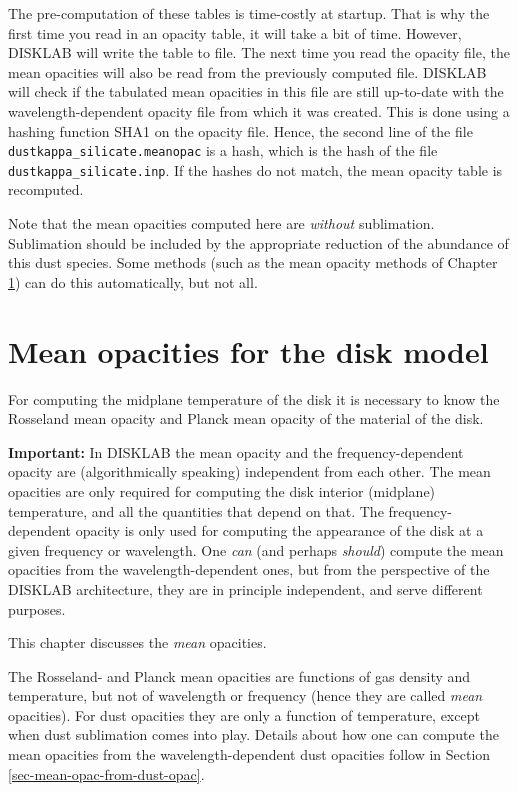 \documentclass{book}
\newcommand{\code}[1]{{\small\tt #1}}
\begin{document}
The pre-computation of these tables is time-costly at startup. That is why the
first time you read in an opacity table, it will take a bit of time.  However,
{\sf DISKLAB} will write the table to file. The next time you read the opacity
file, the mean opacities will also be read from the previously computed
file. {\sf DISKLAB} will check if the tabulated mean opacities in this file are
still up-to-date with the wavelength-dependent opacity file from which it was
created. This is done using a hashing function SHA1 on the opacity file. Hence,
the second line of the file \code{dustkappa\_silicate.meanopac} is a hash, which
is the hash of the file \code{dustkappa\_silicate.inp}. If the hashes do not
match, the mean opacity table is recomputed.

Note that the mean opacities computed here are {\em without} sublimation.
Sublimation should be included by the appropriate reduction of the abundance
of this dust species. Some methods (such as the mean opacity methods of
Chapter \ref{chap-mean-opacities}) can do this automatically, but not all.




\chapter{Mean opacities for the disk model}
\label{chap-mean-opacities}
%
For computing the midplane temperature of the disk it is necessary to know the
Rosseland mean opacity and Planck mean opacity of the material of the disk.

{\bf Important:} In {\sf DISKLAB} the mean opacity and the frequency-dependent
opacity are (algorithmically speaking) independent from each other. The mean
opacities are only required for computing the disk interior (midplane)
temperature, and all the quantities that depend on that. The frequency-dependent
opacity is only used for computing the appearance of the disk at a given
frequency or wavelength. One {\em can} (and perhaps {\em should}) compute the
mean opacities from the wavelength-dependent ones, but from the perspective of
the {\sf DISKLAB} architecture, they are in principle independent, and serve
different purposes.

This chapter discusses the {\em mean} opacities.

The Rosseland- and Planck mean opacities are functions of gas density and
temperature, but not of wavelength or frequency (hence they are called {\em
  mean} opacities). For dust opacities they are only a function of temperature,
except when dust sublimation comes into play. Details about how one can
compute the mean opacities from the wavelength-dependent dust opacities
follow in Section \ref{sec-mean-opac-from-dust-opac}.
\end{document}
